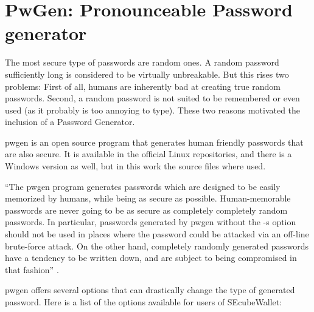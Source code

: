 \section{PwGen: Pronounceable Password generator}

The most secure type of passwords are random ones. A random password sufficiently long is considered to be virtually unbreakable. But this rises two problems: First of all, humans are inherently bad at creating true random passwords. Second, a random password is not suited to be remembered or even used (as it probably is too annoying to type). These two reasons motivated the inclusion of a Password Generator.

pwgen is an open source program that generates human friendly passwords that are also secure. It is available in the official Linux repositories, and there is a Windows version as well, but in this work the source files where used.

``The pwgen program generates passwords which are designed to be easily memorized by humans, while being as secure as possible. Human-memorable passwords are never going to be as secure as completely completely random passwords. In particular, passwords generated by pwgen without the -s option should not be used in places where the password could be attacked via an off-line brute-force attack. On the other hand, completely randomly generated passwords have a tendency to be written down, and are subject to being compromised in that fashion'' \cite{pwgen}.

pwgen offers several options that can drastically change the type of generated password. Here is a list of the options available for users of SEcubeWallet:

